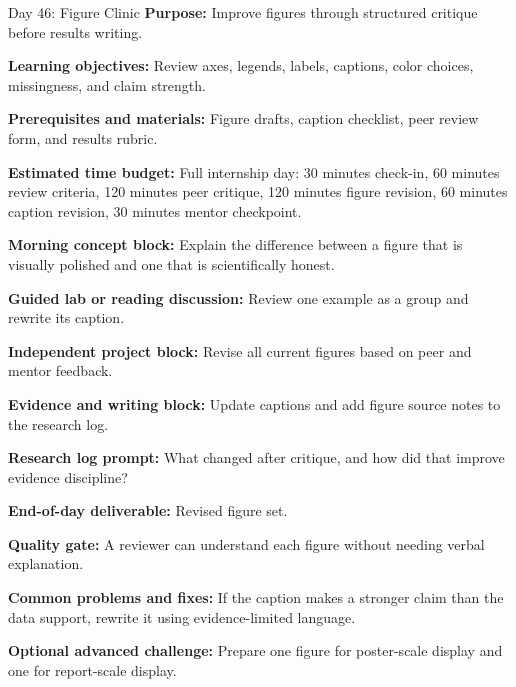 \begin{dailybox}{Day 46: Figure Clinic}
\textbf{Purpose:} Improve figures through structured critique before results writing.

\textbf{Learning objectives:} Review axes, legends, labels, captions, color choices, missingness, and claim strength.

\textbf{Prerequisites and materials:} Figure drafts, caption checklist, peer review form, and results rubric.

\textbf{Estimated time budget:} Full internship day: 30 minutes check-in, 60 minutes review criteria, 120 minutes peer critique, 120 minutes figure revision, 60 minutes caption revision, 30 minutes mentor checkpoint.

\textbf{Morning concept block:} Explain the difference between a figure that is visually polished and one that is scientifically honest.

\textbf{Guided lab or reading discussion:} Review one example as a group and rewrite its caption.

\textbf{Independent project block:} Revise all current figures based on peer and mentor feedback.

\textbf{Evidence and writing block:} Update captions and add figure source notes to the research log.

\textbf{Research log prompt:} What changed after critique, and how did that improve evidence discipline?

\textbf{End-of-day deliverable:} Revised figure set.

\textbf{Quality gate:} A reviewer can understand each figure without needing verbal explanation.

\textbf{Common problems and fixes:} If the caption makes a stronger claim than the data support, rewrite it using evidence-limited language.

\textbf{Optional advanced challenge:} Prepare one figure for poster-scale display and one for report-scale display.
\end{dailybox}


